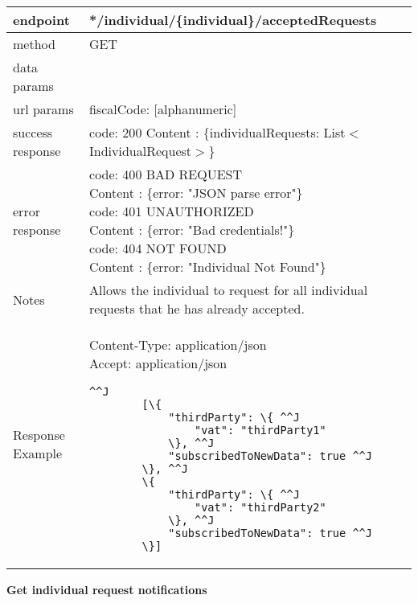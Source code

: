 	\begin{tabularx}{\linewidth}{| l| l }
		\hline
		endpoint & */individual/\{individual\}/acceptedRequests \\
		\hline
		method & GET \\
		\hline
		data params & \\
		\hline
		url params &
		\parbox{0.7\textwidth}{
			\bigskip
			fiscalCode: [alphanumeric]
			\bigskip
		} \\
		\hline
		success response &
		\parbox{0.7\textwidth}{
			\bigskip
			code: 200\\
			Content : \{individualRequests: List$<$IndividualRequest$>$\}
			\bigskip
		} \\
		\hline
		error response &
		\parbox{0.7\textwidth}{
			\bigskip
			code: 400 BAD REQUEST \\
			Content : \{error: "JSON parse error"\}\\
			code: 401 UNAUTHORIZED \\
			Content : \{error: "Bad credentials!"\}\\
			code: 404 NOT FOUND \\
			Content : \{error: "Individual Not Found"\}
			\bigskip
		} \\
		\hline
		Notes & 
		\parbox{0.7\textwidth}{
			\bigskip Allows the individual to request for all individual requests that he has already accepted.
		\bigskip}  \\
		\hline
		Response Example & 
		\parbox{0.8\textwidth}{
		\bigskip
		Content-Type: application/json \\
		Accept: application/json \\
		\bigskip
		\begin{lstlisting}^^J
		[\{
			"thirdParty": \{ ^^J
				"vat": "thirdParty1"
			\}, ^^J
			"subscribedToNewData": true ^^J
		\}, ^^J
		\{
			"thirdParty": \{ ^^J
				"vat": "thirdParty2"
			\}, ^^J
			"subscribedToNewData": true ^^J
		\}]
	\end{lstlisting}
	} \\
	\hline
	\end{tabularx}
	
	\textbf{Get individual request notifications} \\

